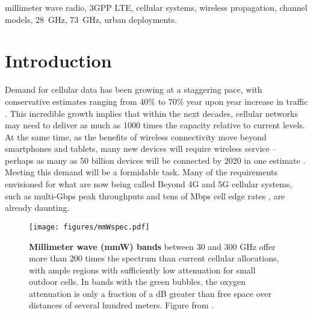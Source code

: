 \documentclass[journal]{IEEEtran}
\begin{document}
\begin{IEEEkeywords}
millimeter wave radio, 3GPP LTE, cellular systems, wireless propagation,
channel models, 28~GHz, 73~GHz, urban deployments.
\end{IEEEkeywords}

\section{Introduction}
\label{sec:intro}

Demand for cellular data has been growing at a staggering pace,
with conservative estimates ranging from 40\% to 70\% year upon year
increase in traffic \cite{CiscoVNI:latest,EricssonMDT:latest,UMTSForecast}.
This incredible growth implies that within the next decades,
cellular networks may need to deliver as much as
1000 times the capacity relative to current levels.
At the same time, as the benefits of wireless connectivity move beyond smartphones
and tablets, many new devices will require wireless service --
perhaps as many as 50 billion devices will be connected by 2020 in one estimate
\cite{Ericsson-50Billion}.
Meeting this demand will be a formidable task.  Many of the requirements
envisioned for what are now being called
Beyond 4G and 5G cellular systems, such as multi-Gbps
peak throughputs and tens of Mbps cell edge rates \cite{NSN-B4G:12},
are already daunting.

\begin{figure}
\begin{center}
    \texttt{[image: figures/mmWspec.pdf]}
\end{center}
\caption{\textbf{Millimeter wave (mmW) bands} between 30 and 300 GHz
offer more than 200 times the spectrum than current cellular allocations,
with ample regions with sufficiently low attenuation for small outdoor cells.
In bands with the green bubbles, the
oxygen attenuation is only a fraction of a dB greater than free space over distances of several hundred meters.
Figure from \cite{Ted:60Gstate11}.
}
\label{fig:mmWaveSpec}
\vspace{-0.1in}
\end{figure}
\end{document}
